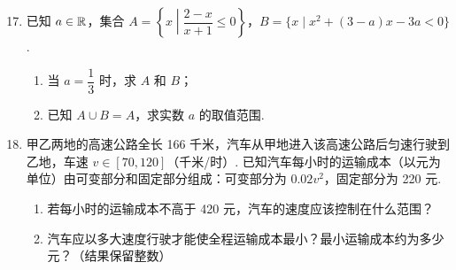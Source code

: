 \documentclass[a4paper,11pt]{article}
\begin{document}
\begin{enumerate}
\setcounter{enumi}{16}

\item 已知 $a\in\mathbb{R}$，集合 $A=\left\{x\middle|\dfrac{2-x}{x+1}\leqslant0\right\}$，$B=\{x\mid x^2+(3-a)x-3a<0\}$.

\begin{enumerate}[label=(\arabic*)]
\item 当 $a=\dfrac13$ 时，求 $A$ 和 $B$；
\item 已知 $A\cup B=A$，求实数 $a$ 的取值范围.
\end{enumerate}

\ifanswer
\solbegin
{}
\solend

\fi

\ansspace[6]

\item 甲乙两地的高速公路全长 166 千米，汽车从甲地进入该高速公路后匀速行驶到乙地，车速 $v\in[70,120]$（千米/时）. 已知汽车每小时的运输成本（以元为单位）由可变部分和固定部分组成：可变部分为 $0.02v^2$，固定部分为 220 元.

\begin{enumerate}[label=(\arabic*)]
\item 若每小时的运输成本不高于 420 元，汽车的速度应该控制在什么范围？
\item 汽车应以多大速度行驶才能使全程运输成本最小？最小运输成本约为多少元？（结果保留整数）
\end{enumerate}


\end{enumerate}
\end{document}
